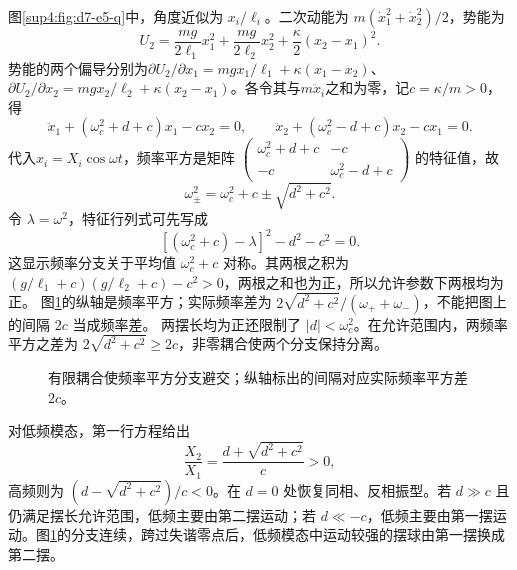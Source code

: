 \begin{solution}
图\ref{sup4:fig:d7-e5-q}中，角度近似为 $x_i/\ell_i$。二次动能为 $m(\dot x_1^2+\dot x_2^2)/2$，势能为
\[
U_2=\frac{mg}{2\ell_1}x_1^2+\frac{mg}{2\ell_2}x_2^2
+\frac\kappa2(x_2-x_1)^2.
\]
势能的两个偏导分别为$\partial U_2/\partial x_1=mgx_1/\ell_1+\kappa(x_1-x_2)$、$\partial U_2/\partial x_2=mgx_2/\ell_2+\kappa(x_2-x_1)$。各令其与$m\ddot x_i$之和为零，记$c=\kappa/m>0$，得
\[
\ddot x_1+(\omega_c^2+d+c)x_1-cx_2=0,\qquad
\ddot x_2+(\omega_c^2-d+c)x_2-cx_1=0.
\]
代入$x_i=X_i\cos\omega t$，频率平方是矩阵
$\left(\begin{smallmatrix}\omega_c^2+d+c&-c\\-c&\omega_c^2-d+c\end{smallmatrix}\right)$ 的特征值，故
\[
\boxed{\omega_\pm^2=\omega_c^2+c\pm\sqrt{d^2+c^2}.}
\]
令 $\lambda=\omega^2$，特征行列式可先写成
\[
[(\omega_c^2+c)-\lambda]^2-d^2-c^2=0.
\]
这显示频率分支关于平均值 $\omega_c^2+c$ 对称。其两根之积为 $(g/\ell_1+c)(g/\ell_2+c)-c^2>0$，两根之和也为正，所以允许参数下两根均为正。
图\ref{sup4:fig:d7-e5-s}的纵轴是频率平方；实际频率差为 $2\sqrt{d^2+c^2}/(\omega_++\omega_-)$，不能把图上的间隔 $2c$ 当成频率差。
两摆长均为正还限制了 $|d|<\omega_c^2$。在允许范围内，两频率平方之差为 $2\sqrt{d^2+c^2}\ge2c$，非零耦合使两个分支保持分离。
\begin{figure}[H]\centering
{}
\caption{有限耦合使频率平方分支避交；纵轴标出的间隔对应实际频率平方差 $2c$。}\label{sup4:fig:d7-e5-s}
\end{figure}
对低频模态，第一行方程给出
\[
\frac{X_2}{X_1}=\frac{d+\sqrt{d^2+c^2}}{c}>0,
\]
高频则为 $(d-\sqrt{d^2+c^2})/c<0$。在 $d=0$ 处恢复同相、反相振型。若 $d\gg c$ 且仍满足摆长允许范围，低频主要由第二摆运动；若 $d\ll-c$，低频主要由第一摆运动。图\ref{sup4:fig:d7-e5-s}的分支连续，跨过失谐零点后，低频模态中运动较强的摆球由第一摆换成第二摆。
\end{solution}



